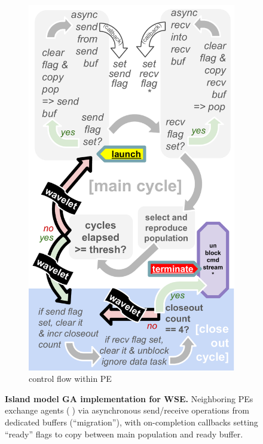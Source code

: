 \begin{figure}
\begin{subfigure}{0.5\linewidth}
    \includegraphics[width=0.8\linewidth]{img/controlflow-schematic}%
    \vspace{-0.05in}
    \caption{control flow within PE}
  \end{subfigure}
  \vspace{-0.25in}
  \caption{%
  \textbf{Island model GA implementation for WSE.}
  \footnotesize
  Neighboring PEs exchange agents (🦠) via asynchronous send/receive operations from dedicated buffers (``migration''), with on-completion callbacks setting ``ready'' flags to copy between main population and ready buffer.
  }
  \label{fig:async-ga-schematic}
  \vspace{-0.2in}
\end{figure}
